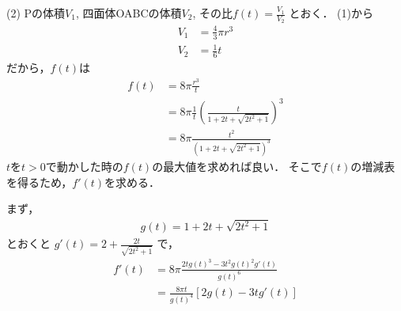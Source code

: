 \begin{multicols}{2}
  \vspace{10pt}
  (2)
  Pの体積$V_1$, 四面体OABCの体積$V_2$, その比$f(t) = \frac{V_1}{V_2}$ とおく．
  (1)から
  \begin{align*}
    V_1 & = \frac{4}{3} \pi r^3 \\
    V_2 & = \frac{1}{6} t
  \end{align*}
  だから，$f(t)$は
  \begin{align}
    f(t) & = 8\pi \frac{r^3}{t}                                          \nonumber \\
         & = 8\pi \frac{1}{t}\left(\frac{t}{1+2t+\sqrt{2t^2+1}}\right)^3 \nonumber \\
         & = 8\pi \frac{t^2}{(1+2t+\sqrt{2t^2+1})^3} \label{eq:4}
  \end{align}
  $t$を$t>0$で動かした時の$f(t)$の最大値を求めれば良い．
  そこで$f(t)$の増減表を得るため，$f'(t)$を求める．

  まず，
  \begin{align}
    g(t) = 1+2t+\sqrt{2t^2+1}  \label{eq:5}
  \end{align}
  とおくと $g'(t) = 2 + \frac{2t}{\sqrt{2t^2+1}}$ で，
  \begin{align*}
    f'(t) & = 8\pi \frac{2t g(t)^3 - 3t^2 g(t)^2 g'(t)}{g(t)^6}      \\
          & = \frac{8\pi t}{g(t)^4} \left[ 2 g(t) - 3t g'(t) \right]
  \end{align*}


\end{multicols}
